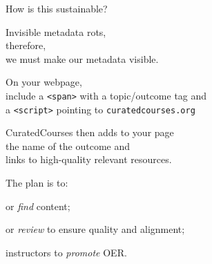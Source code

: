 \documentclass{chalkboard}
\begin{document}
\begin{frame}
\end{frame}

\clearbackgroundpicture


\begin{frame}
\end{frame}
\clearbackgroundpicture

\begin{frame}
  \huge

  How is this sustainable?

  \vfill

  Invisible metadata rots, \\
  \quad therefore, \\
  we must make our metadata visible.

\end{frame}

\begin{frame}
\end{frame}
\clearbackgroundpicture

\begin{frame}
  \huge

  On your webpage, \\
  \quad include a \texttt{<span>} with a topic/outcome tag and \\
  \quad a \texttt{<script>} pointing to \texttt{curatedcourses.org}

  \vfill

  CuratedCourses then adds to your page \\
  \quad the name of the outcome and \\
  \quad links to high-quality relevant resources.
\end{frame}

\begin{frame}
  \huge

  \vfill

  The plan is to:
  \begin{description}[empower]
  \item[create] or \textit{find} content;
  \item[curate] or \textit{review} to ensure quality and alignment;
  \item[empower] instructors to \textit{promote} OER.
  \end{description}

  \vfill
\end{frame}
\end{document}
